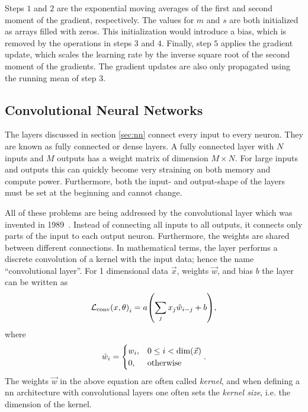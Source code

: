 Steps $1$ and $2$ are the exponential moving averages of the first and second moment of the gradient, respectively. The values for $m$ and $s$ are both initialized as arrays filled with zeros. This initialization would introduce a bias, which is removed by the operations in steps $3$ and $4$. Finally, step $5$ applies the gradient update, which scales the learning rate by the inverse square root of the second moment of the gradients. The gradient updates are also only propagated using the running mean of step $3$.


\subsection{Convolutional Neural Networks}\label{sec:cnn}
The layers discussed in section \ref{sec:nn} connect every input to every neuron. They are known as fully connected or dense layers. A fully connected layer with $N$ inputs and $M$ outputs has a weight matrix of dimension $M\times N$. For large inputs and outputs this can quickly become very straining on both memory and compute power. Furthermore, both the input- and output-shape of the layers must be set at the beginning and cannot change.

All of these problems are being addressed by the convolutional layer which was invented in 1989~\cite{LeCun:1989aaa}. Instead of connecting all inputs to all outputs, it connects only parts of the input to each output neuron. Furthermore, the weights are shared between different connections. In mathematical terms, the layer performs a discrete convolution of a kernel with the input data; hence the name ``convolutional layer''. For 1 dimensional data $\vec{x}$, weights $\vec{w}$, and bias $b$ the layer can be written as
\begin{equation}\label{eq:1dconv_simple}
\mathcal{L}_\text{conv}{\left( x, \theta \right)}_i = a{\left( \sum_j x_j \hat{w}_{i-j} + b \right)},
\end{equation}
where
\begin{equation}
\hat{w}_i = 
	\begin{cases}
		w_i,& 0 \leq i < \text{dim}{\left( \vec{x} \right)}\\
		0,& \text{otherwise}
	\end{cases}.
\end{equation}
The weights $\vec{w}$ in the above equation are often called \emph{kernel}, and when defining a \acrshort{nn} architecture with convolutional layers one often sets the \emph{kernel size}, i.e. the dimension of the kernel.

